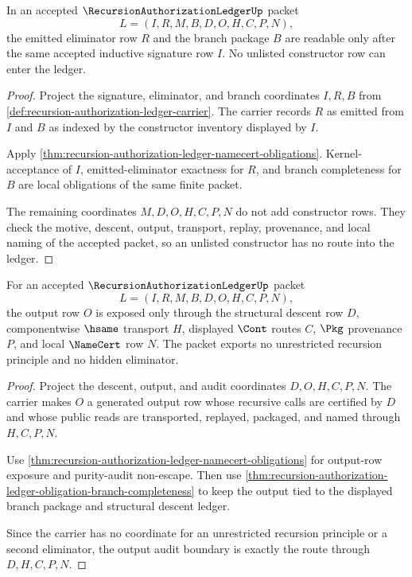 \begin{theorem}
\label{thm:recursion-authorization-ledger-signature-acceptance}
In an accepted $\RecursionAuthorizationLedgerUp$ packet
$$
L=(I,R,M,B,D,O,H,C,P,N),
$$
the emitted eliminator row $R$ and the branch package $B$ are readable only after the same accepted inductive signature row $I$. No unlisted constructor row can enter the ledger.
\end{theorem}
\begin{proof}
Project the signature, eliminator, and branch coordinates $I,R,B$ from \autoref{def:recursion-authorization-ledger-carrier}. The carrier records $R$ as emitted from $I$ and $B$ as indexed by the constructor inventory displayed by $I$.

Apply \autoref{thm:recursion-authorization-ledger-namecert-obligations}. Kernel-acceptance of $I$, emitted-eliminator exactness for $R$, and branch completeness for $B$ are local obligations of the same finite packet.

The remaining coordinates $M,D,O,H,C,P,N$ do not add constructor rows. They check the motive, descent, output, transport, replay, provenance, and local naming of the accepted packet, so an unlisted constructor has no route into the ledger.
\end{proof}

\begin{theorem}
\label{thm:recursion-authorization-ledger-output-audit-boundary}
For an accepted $\RecursionAuthorizationLedgerUp$ packet
$$
L=(I,R,M,B,D,O,H,C,P,N),
$$
the output row $O$ is exposed only through the structural descent row $D$, componentwise $\hsame$ transport $H$, displayed $\Cont$ routes $C$, $\Pkg$ provenance $P$, and local $\NameCert$ row $N$. The packet exports no unrestricted recursion principle and no hidden eliminator.
\end{theorem}
\begin{proof}
Project the descent, output, and audit coordinates $D,O,H,C,P,N$. The carrier makes $O$ a generated output row whose recursive calls are certified by $D$ and whose public reads are transported, replayed, packaged, and named through $H,C,P,N$.

Use \autoref{thm:recursion-authorization-ledger-namecert-obligations} for output-row exposure and purity-audit non-escape. Then use \autoref{thm:recursion-authorization-ledger-obligation-branch-completeness} to keep the output tied to the displayed branch package and structural descent ledger.

Since the carrier has no coordinate for an unrestricted recursion principle or a second eliminator, the output audit boundary is exactly the route through $D,H,C,P,N$.
\end{proof}

